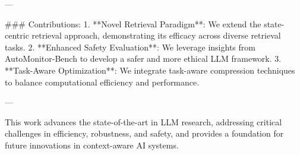 ---

### Contributions:
1. **Novel Retrieval Paradigm**: We extend the state-centric retrieval approach, demonstrating its efficacy across diverse retrieval tasks.
2. **Enhanced Safety Evaluation**: We leverage insights from AutoMonitor-Bench to develop a safer and more ethical LLM framework.
3. **Task-Aware Optimization**: We integrate task-aware compression techniques to balance computational efficiency and performance.

---

This work advances the state-of-the-art in LLM research, addressing critical challenges in efficiency, robustness, and safety, and provides a foundation for future innovations in context-aware AI systems.